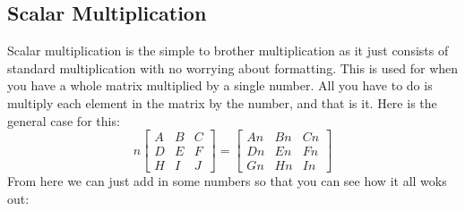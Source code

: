 \documentclass{article}
\begin{document}
\subsection{Scalar Multiplication}
Scalar multiplication is the simple to brother multiplication as it just consists of standard multiplication with no worrying about formatting. This is used for when you have a whole matrix multiplied by a single number. All you have to do is multiply each element in the matrix by the number, and that is it. Here is the general case for this:
\begin{equation*}
	n
	\begin{bmatrix}
		A & B & C\\
		D & E & F\\
		H & I & J
	\end{bmatrix}
	=
	\begin{bmatrix}
		An & Bn & Cn\\
		Dn & En & Fn\\
		Gn & Hn & In
	\end{bmatrix}
\end{equation*}
From here we can just add in some numbers so that you can see how it all woks out:
\end{document}
